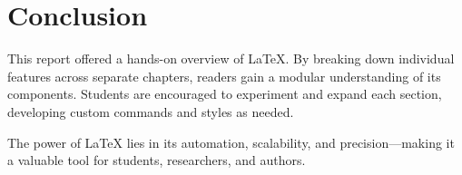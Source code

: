 \documentclass[12pt,a4paper]{report}
\begin{document}
\chapter{Conclusion}
\justify
This report offered a hands-on overview of LaTeX. By breaking down individual features across separate chapters, readers gain a modular understanding of its components. Students are encouraged to experiment and expand each section, developing custom commands and styles as needed.

The power of LaTeX lies in its automation, scalability, and precision—making it a valuable tool for students, researchers, and authors.

\lipsum[10]
\end{document}
